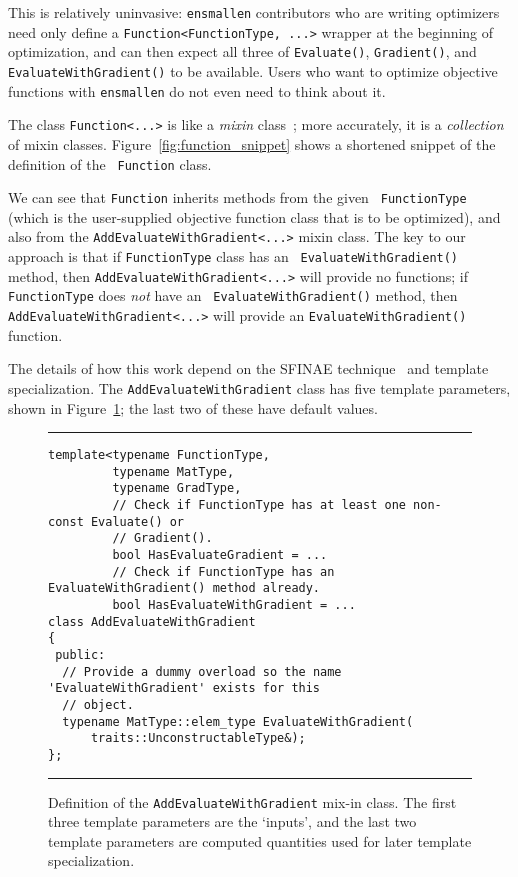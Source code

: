 This is relatively uninvasive: {\tt ensmallen} contributors who are writing
optimizers need only define a {\tt Function<FunctionType, ...>} wrapper at the
beginning of optimization, and can then expect all three of {\tt Evaluate()},
{\tt Gradient()}, and {\tt EvaluateWithGradient()} to be available.  Users who
want to optimize objective functions with {\tt ensmallen} do not even need to
think about it.

The class {\tt Function<...>} is like a {\it mixin}
class~\cite{smaragdakis2000mixin}; more accurately, it is a {\it collection} of
mixin classes.  Figure~\ref{fig:function_snippet} shows a shortened snippet of the definition of the {\tt
Function} class.

We can see that {\tt Function} inherits methods from the given {\tt
FunctionType} (which is the user-supplied objective function class that is to be
optimized), and also from the {\tt AddEvaluateWithGradient<...>} mixin class.
The key to our approach is that if {\tt FunctionType} class has an {\tt
EvaluateWithGradient()} method, then {\tt AddEvaluateWithGradient<...>} will
provide no functions; if {\tt FunctionType} does {\em not} have an {\tt
EvaluateWithGradient()} method, then {\tt AddEvaluateWithGradient<...>} will
provide an {\tt EvaluateWithGradient()} function.

The details of how this work depend on the SFINAE technique~\cite{TODO} and
template specialization.  The {\tt AddEvaluateWithGradient} class has five
template parameters, shown in Figure~\ref{fig:aewg}; the last two of these have
default values.

\begin{figure}[b!]
\hrule
\vspace{1ex}
\begin{verbatim}
template<typename FunctionType,
         typename MatType,
         typename GradType,
         // Check if FunctionType has at least one non-const Evaluate() or
         // Gradient().
         bool HasEvaluateGradient = ...
         // Check if FunctionType has an EvaluateWithGradient() method already.
         bool HasEvaluateWithGradient = ...
class AddEvaluateWithGradient
{
 public:
  // Provide a dummy overload so the name 'EvaluateWithGradient' exists for this
  // object.
  typename MatType::elem_type EvaluateWithGradient(
      traits::UnconstructableType&);
};
\end{verbatim}
\hrule
\vspace*{-0.5em}
\caption{Definition of the {\tt AddEvaluateWithGradient} mix-in class.  The
first three template parameters are the `inputs', and the last two template
parameters are computed quantities used for later template specialization.}
\label{fig:aewg}
\end{figure}

